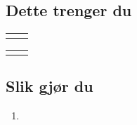 \section*{}


\subsection*{Dette trenger du}


\begin{table}[!htbp]
    \begin{tabular}[t]{rl}
        \textbf{} &       
    \end{tabular}
    \qquad
    \begin{tabular}[t]{rl}
        \textbf{} & 
    \end{tabular}
\end{table}



\subsection*{Slik gjør du}

\begin{enumerate}
    \item 
\end{enumerate}